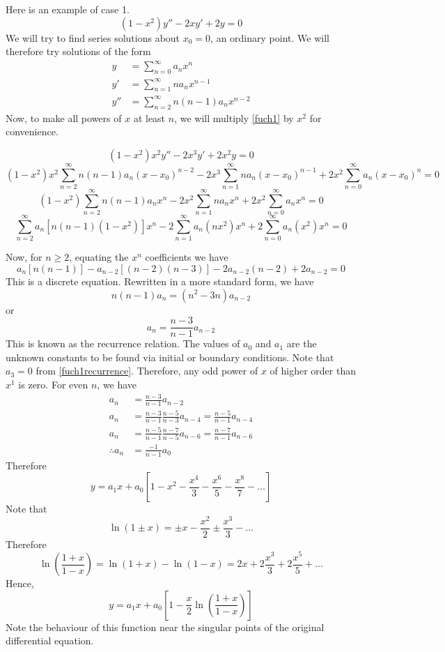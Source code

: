 \begin{example}
	Here is an example of case 1.
	\begin{equation}\label{fuch1}
		(1-x^2)y'' - 2xy' + 2y = 0
	\end{equation}
	We will try to find series solutions about \(x_0=0\), an ordinary point.
	We will therefore try solutions of the form
	\begin{align*}
		y   & = \sum_{n=0}^\infty a_n x^n           \\
		y'  & = \sum_{n=1}^\infty na_n x^{n-1}      \\
		y'' & = \sum_{n=2}^\infty n(n-1)a_n x^{n-2}
	\end{align*}
	Now, to make all powers of \(x\) at least \(n\), we will multiply \eqref{fuch1} by \(x^2\) for convenience.

	\[
		(1-x^2)x^2y'' - 2x^3y' + 2x^2y = 0
	\]
	\[
		(1-x^2)x^2\sum_{n=2}^\infty n(n-1)a_n(x-x_0)^{n-2} - 2x^3\sum_{n=1}^\infty na_n(x-x_0)^{n-1} + 2x^2\sum_{n=0}^\infty a_n(x-x_0)^n = 0
	\]
	\[
		(1-x^2)\sum_{n=2}^\infty n(n-1)a_n x^n - 2x^2\sum_{n=1}^\infty na_n x^n + 2x^2\sum_{n=0}^\infty a_n x^n = 0
	\]
	\[
		\sum_{n=2}^\infty a_n[n(n-1)(1-x^2)]x^n - 2\sum_{n=1}^\infty a_n(nx^2)x^n + 2\sum_{n=0}^\infty a_n(x^2)x^n = 0
	\]

	Now, for \(n \geq 2\), equating the \(x^n\) coefficients we have
	\[
		a_n[n(n-1)] - a_{n-2}[(n-2)(n-3)] - 2a_{n-2}(n-2) + 2a_{n-2} = 0
	\]
	This is a discrete equation.
	Rewritten in a more standard form, we have
	\[
		n(n-1)a_n = (n^2 - 3n)a_{n-2}
	\]
	or
	\begin{equation}\label{fuch1recurrence}
		a_n = \frac{n-3}{n-1}a_{n-2}
	\end{equation}
	This is known as the recurrence relation.
	The values of \(a_0\) and \(a_1\) are the unknown constants to be found via initial or boundary conditions.
	Note that \(a_3 = 0\) from \eqref{fuch1recurrence}.
	Therefore, any odd power of \(x\) of higher order than \(x^1\) is zero.
	For even \(n\), we have
	\begin{align*}
		a_n            & = \frac{n-3}{n-1}a_{n-2}                                         \\
		a_n            & = \frac{n-3}{n-1}\frac{n-5}{n-3}a_{n-4} = \frac{n-5}{n-1}a_{n-4} \\
		a_n            & = \frac{n-5}{n-1}\frac{n-7}{n-5}a_{n-6} = \frac{n-7}{n-1}a_{n-6} \\
		\therefore a_n & = \frac{-1}{n-1}a_0
	\end{align*}
	Therefore
	\[
		y = a_1 x + a_0\left[ 1 - x^2 - \frac{x^4}{3} - \frac{x^6}{5} - \frac{x^8}{7} - \dots \right]
	\]
	Note that
	\[
		\ln(1 \pm x) = \pm x - \frac{x^2}{2} \pm \frac{x^3}{3} - \dots
	\]
	Therefore
	\[
		\ln(\frac{1+x}{1-x}) = \ln(1+x) - \ln(1-x) = 2x + 2\frac{x^3}{3} + 2\frac{x^5}{5} + \dots
	\]
	Hence,
	\[
		y = a_1x + a_0\left[ 1-\frac{x}{2}\ln\left( \frac{1+x}{1-x} \right) \right]
	\]
	Note the behaviour of this function near the singular points of the original differential equation.
\end{example}
